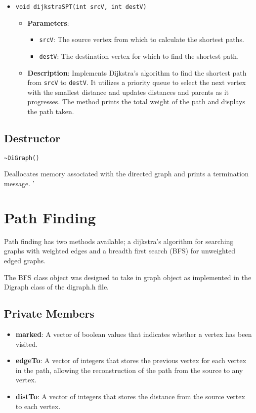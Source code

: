 \documentclass{article}
\begin{document}
\begin{itemize}
    \item \texttt{void dijkstraSPT(int srcV, int destV)}
    \begin{itemize}
        \item \textbf{Parameters}: 
        \begin{itemize}
            \item \texttt{srcV}: The source vertex from which to calculate the shortest paths.
            \item \texttt{destV}: The destination vertex for which to find the shortest path.
        \end{itemize}
        \item \textbf{Description}: Implements Dijkstra's algorithm to find the shortest path from \texttt{srcV} to \texttt{destV}. It utilizes a priority queue to select the next vertex with the smallest distance and updates distances and parents as it progresses. The method prints the total weight of the path and displays the path taken.
    \end{itemize}
\end{itemize}

\subsection{Destructor}
\begin{verbatim}
~DiGraph()
\end{verbatim}
Deallocates memory associated with the directed graph and prints a termination message.
'
\section{Path Finding}
Path finding has two methods available; a dijkstra's algorithm for searching graphs with weighted edges and a breadth first search (BFS) for unweighted edged graphs.

The BFS class object was designed to take in graph object as implemented in the Digraph class of the digraph.h file.

\subsection{Private Members}
\begin{itemize}
    \item \textbf{marked}: A vector of boolean values that indicates whether a vertex has been visited.
    \item \textbf{edgeTo}: A vector of integers that stores the previous vertex for each vertex in the path, allowing the reconstruction of the path from the source to any vertex.
    \item \textbf{distTo}: A vector of integers that stores the distance from the source vertex to each vertex.
\end{itemize}
\end{document}
